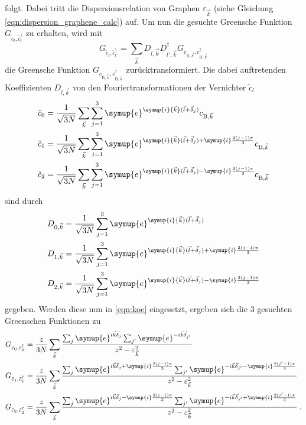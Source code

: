 folgt. 
Dabei tritt die Dispersionsrelation von Graphen $\varepsilon_{\vec{k}}$ (siehe Gleichung \eqref{eqn:dispersion_graphene_calc}) auf. 
Um nun die gesuchte Greensche Funktion $G_{\tilde{c}_l, \tilde{c}_l^{\dagger}}$ zu erhalten, wird mit 
\begin{equation}
    G_{\tilde{c}_l, \tilde{c}^\dagger_{l'}} = \sum_{\vec{k}} D_{l,\vec{k}} D^\dagger_{l',\vec{k}}G_{c_{\text{B},\vec{k}}, c^\dagger_{\text{B},\vec{k}}} \label{eqn:koe}
\end{equation}
die Greensche Funktion $G_{c_{\text{B},\vec{k}}, c^\dagger_{\text{B},\vec{k}}}$ zurücktransformiert.
Die dabei auftretenden Koeffizienten $D_{l,\vec{k}}$ von den Fouriertransformationen der Vernichter $\tilde{c}_l$
\begin{align*}
    \tilde{c}_0 &= \frac{1}{\sqrt{3N}}\sum_{\vec{k}} \sum_{j=1}^3\symup{e}^{\symup{i}{\vec{k}}(\vec{l}+\vec{\delta}_j)}                              c_{\text{B}, \vec{k}}  \\
    \tilde{c}_1 &= \frac{1}{\sqrt{3N}}\sum_{\vec{k}} \sum_{j=1}^3\symup{e}^{\symup{i}{\vec{k}}(\vec{l}+\vec{\delta}_j)+\symup{i}\frac{2(j-1)\pi}{3}} c_{\text{B}, \vec{k}}  \\
    \tilde{c}_2 &= \frac{1}{\sqrt{3N}}\sum_{\vec{k}} \sum_{j=1}^3\symup{e}^{\symup{i}{\vec{k}}(\vec{l}+\vec{\delta}_j)-\symup{i}\frac{2(j-1)\pi}{3}} c_{\text{B}, \vec{k}}  
\end{align*}
sind durch
\begin{equation}
    \begin{aligned}
    D_{0,\vec{k}} &= \frac{1}{\sqrt{3N}}\sum_{j=1}^3\symup{e}^{\symup{i}{\vec{k}}(\vec{l}+\vec{\delta}_j)} \\
    D_{1,\vec{k}} &= \frac{1}{\sqrt{3N}}\sum_{j=1}^3\symup{e}^{\symup{i}{\vec{k}}(\vec{l}+\vec{\delta}_j)+\symup{i}\frac{2(j-1)\pi}{3}}  \\
    D_{2,\vec{k}} &= \frac{1}{\sqrt{3N}}\sum_{j=1}^3\symup{e}^{\symup{i}{\vec{k}}(\vec{l}+\vec{\delta}_j)-\symup{i}\frac{2(j-1)\pi}{3}}  \label{eqn:fourierko}
    \end{aligned}    
\end{equation}
gegeben.
Werden diese nun in \eqref{eqn:koe} eingesetzt, ergeben sich die 3 gesuchten Greenschen Funktionen zu 
\begin{align}
    G_{\tilde{c}_0, \tilde{c}^\dagger_0} &= \frac{z}{3N} \sum_{\vec{k}} \frac{\sum_j \symup{e}^{i{\vec{k}}\vec{\delta}_j} \sum_{j'} \symup{e}^{-i{\vec{k}}\vec{\delta}_{j'}}                                                            }{z^2-\varepsilon_{\vec{k}}^2} \\
    G_{\tilde{c}_1, \tilde{c}^\dagger_1} &= \frac{z}{3N} \sum_{\vec{k}} \frac{\sum_j \symup{e}^{i{\vec{k}}\vec{\delta}_j+\symup{i}\frac{2(j-1)\pi}{3}} \sum_{j'} \symup{e}^{-i{\vec{k}}\vec{\delta}_{j'}-\symup{i}\frac{2(j'-1)\pi}{3}} }{z^2-\varepsilon_{\vec{k}}^2} \\
    G_{\tilde{c}_2, \tilde{c}^\dagger_2} &= \frac{z}{3N} \sum_{\vec{k}} \frac{\sum_j \symup{e}^{i{\vec{k}}\vec{\delta}_j-\symup{i}\frac{2(j-1)\pi}{3}} \sum_{j'} \symup{e}^{-i{\vec{k}}\vec{\delta}_{j'}+\symup{i}\frac{2(j'-1)\pi}{3}} }{z^2-\varepsilon_{\vec{k}}^2} \; .
\end{align}
